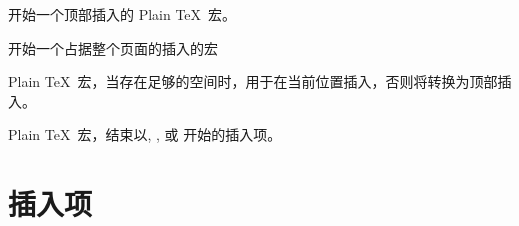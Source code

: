 \documentclass{book}
\begin{document}
\begin{inventory}
\item [\cs{topinsert}]
      开始一个顶部插入的 Plain \TeX\ 宏。


\item [\cs{pageinsert}]
      开始一个占据整个页面的插入的宏



\item [\cs{midinsert}]
      Plain \TeX\ 宏，当存在足够的空间时，用于在当前位置插入，否则将转换为顶部插入。



\item [\cs{endinsert}]
      Plain \TeX\ 宏，结束以, ,
      或  开始的插入项。


\end{inventory}


\section{插入项}

\end{document}

